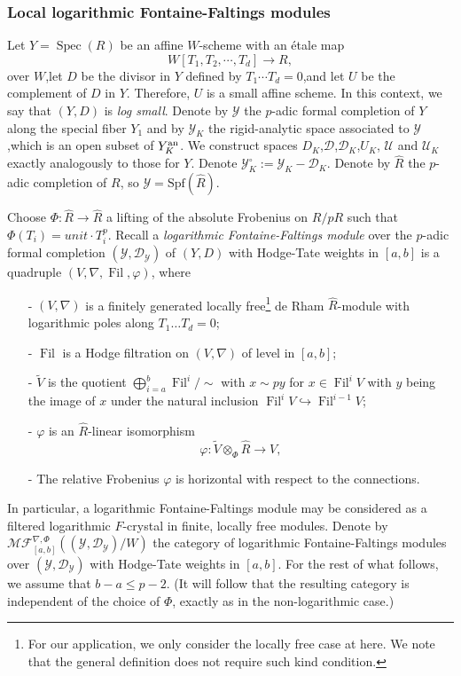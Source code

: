 \documentclass[12pt,twoside]{book}
\theoremstyle{plain}
\theoremstyle{definition}
\theoremstyle{remark}
\newcommand{\mD}{{\mathcal D}}
\newcommand{\mU}{{\mathcal U}}
\newcommand{\mY}{{\mathcal Y}}
\DeclareMathOperator\Fil{Fil}
\DeclareMathOperator\Spec{Spec}
\newcommand{\MF}{\mathcal{MF}}
\numberwithin{equation}{section}
\begin{document}
\subsubsection{Local logarithmic Fontaine-Faltings modules}
Let $Y=\Spec(R)$ be an affine $W$-scheme with an \'etale map $$W[T_1,T_2,\cdots,T_{d}]\rightarrow R,$$ over $W$,let $D$ be the divisor in $Y$ defined by $T_1\cdots T_d=0$,and let $U$ be the complement of $D$ in $Y$. Therefore, $U$ is a small affine scheme. In this context, we say that $(Y,D)$ is \emph{log small}. Denote by $\mY$ the $p$-adic formal completion of $Y$ along the special fiber $Y_1$ and by $\mY_K$ the rigid-analytic space associated to $\mY$,which is an open subset of $Y_K^{\rm an}$. We construct spaces $D_K$,$\mD$,$\mD_K$,$U_K$, $\mU$ and $\mU_K$ exactly analogously to those for $Y$. Denote $\mY^\circ_K:=\mY_K-\mD_K$. Denote by $\widehat{R}$ the $p$-adic completion of $R$, so $\mY=\text{Spf}(\widehat{R})$.

Choose $\Phi:\widehat{R}\rightarrow\widehat{R}$ a lifting of the absolute Frobenius on $R/pR$ such that $\Phi(T_i)=unit\cdot T_i^p$. Recall a \emph{logarithmic Fontaine-Faltings module} over the $p$-adic formal completion $(\mY,\mD_\mY)$ of $(Y,D)$ with Hodge-Tate weights in $[a,b]$ is a quadruple $(V,\nabla,\Fil,\varphi)$, where
\begin{itemize}
\item[-] $(V,\nabla)$ is a finitely generated locally free\footnote{For our application, we only consider the locally free case at here. We note that the general definition does not require such kind condition.} de Rham $\widehat{R}$-module with logarithmic poles along $T_1\dots T_d=0$;
\item[-] $\Fil$ is a Hodge filtration on $(V,\nabla)$ of level in $[a,b]$;
\item[-] $\widetilde{V}$ is the quotient $\bigoplus\limits_{i=a}^b\Fil^i/\sim$ with $x\sim py$ for $x\in\Fil^iV$ with $y$ being the image of $x$ under the natural inclusion $\Fil^iV\hookrightarrow\Fil^{i-1}V$;
\item[-] $\varphi$ is an $\widehat{R}$-linear isomorphism \[\varphi:\widetilde{V}\otimes_{\Phi}\widehat{R} \longrightarrow V,\]
\item[-] The relative Frobenius $\varphi$ is horizontal with respect to the connections.
\end{itemize}
In particular, a logarithmic Fontaine-Faltings module may be considered as a filtered logarithmic $F$-crystal in finite, locally free modules.
Denote by $\MF_{[a,b]}^{\nabla,\Phi}((\mY,\mD_\mY)/W)$ the category of logarithmic Fontaine-Faltings modules over $(\mY,\mD_\mY)$ with Hodge-Tate weights in $[a,b]$. For the rest of what follows, we assume that $b-a\leq p-2$. (It will follow that the resulting category is independent of the choice of $\Phi$, exactly as in the non-logarithmic case.)
\end{document}
